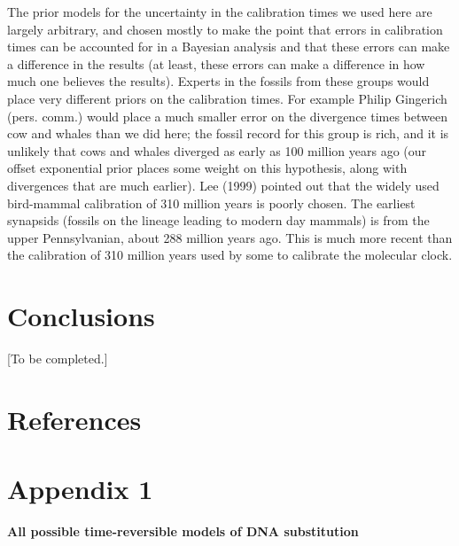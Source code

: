 \documentclass{svmult}
\begin{document}
The prior models for the uncertainty in the calibration times we used here are largely arbitrary, and chosen mostly to make the point that
errors in calibration times can be accounted for in a Bayesian analysis and that these errors can make a difference in the results (at least, these errors can
make a difference in how much one believes the results). Experts in the fossils from these groups would place very different priors on
the calibration times. For example Philip Gingerich (pers. comm.) would place a much smaller error on the divergence times between
cow and whales than we did here; the fossil record for this group is rich, and it is unlikely that cows and whales diverged as early as 100 million
years ago (our offset exponential prior places some weight on this hypothesis, along with divergences that are much earlier).
Lee (1999) pointed out that the widely used bird-mammal calibration of 310 million years is poorly chosen. The earliest synapsids (fossils
on the lineage leading to modern day mammals) is from the upper Pennsylvanian, about 288 million years ago. This is much more recent than
the calibration of 310 million years used by some to calibrate the molecular clock. 

\section{Conclusions}
\label{sec:4}


[To be completed.]


\section{References}

\newpage


\section*{Appendix 1}

{\bf All possible time-reversible models of DNA substitution}
\end{document}
